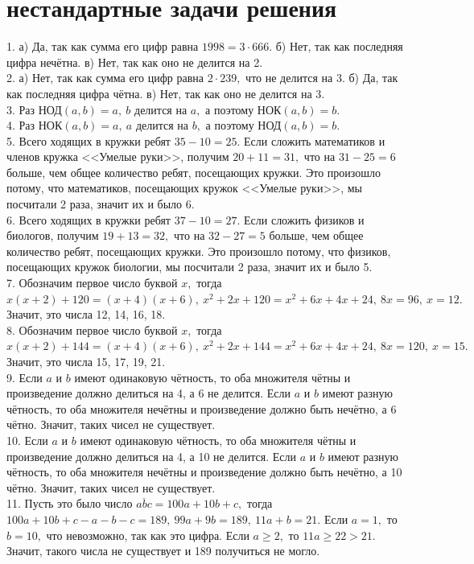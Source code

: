 \documentclass[12pt]{article}
\begin{document}
\section{нестандартные задачи решения}
1. а) Да, так как сумма его цифр равна $1998=3\cdot666.$ б) Нет, так как последняя цифра нечётна. в) Нет, так как оно не делится на 2.\\
2. а) Нет, так как сумма его цифр равна $2\cdot239,$ что не делится на 3. б) Да, так как последняя цифра чётна. в) Нет, так как оно не делится на 3.\\
3. Раз $\text{НОД}(a,b)=a,\ b$ делится на $a,$  а поэтому  $\text{НОК}(a,b)=b.$\\
4. Раз $\text{НОК}(a,b)=a,\ a$ делится на $b,$  а поэтому  $\text{НОД}(a,b)=b.$\\
5. Всего ходящих в кружки ребят $35-10=25.$ Если сложить математиков и членов кружка <<Умелые руки>>, получим $20+11=31,$ что на $31-25=6$ больше, чем общее количество ребят, посещающих кружки. Это произошло потому, что математиков, посещающих кружок <<Умелые руки>>, мы посчитали 2 раза, значит их и было 6.\\
6. Всего ходящих в кружки ребят $37-10=27.$ Если сложить физиков и биологов, получим $19+13=32,$ что на $32-27=5$ больше, чем общее количество ребят, посещающих кружки. Это произошло потому, что физиков, посещающих кружок биологии, мы посчитали 2 раза, значит их и было 5.\\
7. Обозначим первое число буквой $x,$ тогда $x(x+2)+120=(x+4)(x+6),\ x^2+2x+120=x^2+6x+4x+24,\ 8x=96,\ x=12.$ Значит, это числа 12, 14, 16, 18.\\
8. Обозначим первое число буквой $x,$ тогда $x(x+2)+144=(x+4)(x+6),\ x^2+2x+144=x^2+6x+4x+24,\ 8x=120,\ x=15.$ Значит, это числа 15, 17, 19, 21.\\
9. Если $a$ и $b$ имеют одинаковую чётность, то оба множителя чётны и произведение должно делиться на 4, а 6 не делится. Если
$a$ и $b$ имеют разную чётность, то оба множителя нечётны и произведение должно быть нечётно, а 6 чётно. Значит, таких чисел не существует.\\
10. Если $a$ и $b$ имеют одинаковую чётность, то оба множителя чётны и произведение должно делиться на 4, а 10 не делится. Если
$a$ и $b$ имеют разную чётность, то оба множителя нечётны и произведение должно быть нечётно, а 10 чётно. Значит, таких чисел не существует.\\
11. Пусть это было число $\overline{abc}=100a+10b+c,$ тогда $100a+10b+c-a-b-c=189,\ 99a+9b=189,\ 11a+b=21.$ Если $a=1,$ то $b=10,$ что невозможно, так как это цифра. Если $a\geqslant2,$ то $11a\geqslant22>21.$ Значит, такого числа не существует и 189 получиться не могло.\\
\end{document}
